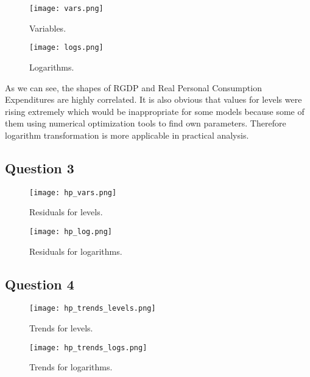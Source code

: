 \documentclass[11pt, oneside]{article}
\begin{document}
\begin{figure}[!htbp]
	\centering
	\begin{minipage}[b]{0.48\textwidth}
		\texttt{[image: vars.png]}
		\caption{Variables.}
	\end{minipage}
	\hfill
	\begin{minipage}[b]{0.48\textwidth}
		\texttt{[image: logs.png]}
		\caption{Logarithms.}
	\end{minipage}
\end{figure}
As we can see, the shapes of RGDP and Real Personal Consumption Expenditures are highly correlated. It is also obvious that values for levels were rising extremely which would be inappropriate for some models because some of them using numerical optimization tools to find own parameters. Therefore logarithm transformation is more applicable in practical analysis.


\subsection*{Question 3}

\begin{figure}[!htbp]
	\centering
	\begin{minipage}[b]{0.48\textwidth}
		\texttt{[image: hp\_vars.png]}
		\caption{Residuals for levels.}
	\end{minipage}
	\hfill
	\begin{minipage}[b]{0.48\textwidth}
		\texttt{[image: hp\_log.png]}
		\caption{Residuals for logarithms.}
	\end{minipage}
\end{figure}
	

\subsection*{Question 4}
\begin{figure}[!hbtp]
	\centering
	\begin{minipage}[b]{0.48\textwidth}
		\texttt{[image: hp\_trends\_levels.png]}
		\caption{Trends for levels.}
	\end{minipage}
	\hfill
	\begin{minipage}[b]{0.48\textwidth}
		\texttt{[image: hp\_trends\_logs.png]}
		\caption{Trends for logarithms.}
	\end{minipage}
\end{figure}
\end{document}
